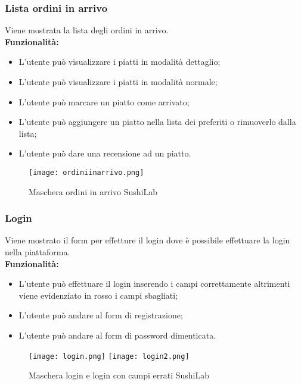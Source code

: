\subsubsection{Lista ordini in arrivo}
Viene mostrata la lista degli ordini in arrivo.\\
\textbf{Funzionalità:}
\begin{itemize}
    \item L'utente può visualizzare i piatti in modalità dettaglio;
    \item L'utente può visualizzare i piatti in modalità normale;
    \item L'utente può marcare un piatto come arrivato;
    \item L'utente può aggiungere un piatto nella lista dei preferiti o rimuoverlo dalla lista;
    \item L'utente può dare una recensione ad un piatto.
\end{itemize}
\begin{figure}[H]
    \centering
    \texttt{[image: ordiniinarrivo.png]}
    \caption{Maschera ordini in arrivo SushiLab}
\end{figure}
\pagebreak

\subsubsection{Login}
Viene mostrato il form per effetture il login dove è possibile effettuare la login nella piattaforma.\\
\textbf{Funzionalità:}
\begin{itemize}
    \item L'utente può effettuare il login inserendo i campi correttamente altrimenti viene evidenziato in rosso i campi sbagliati;
    \item L'utente può andare al form di registrazione;
    \item L'utente può andare al form di password dimenticata.
\end{itemize}
\begin{figure}[H]
    \centering
    \texttt{[image: login.png]}
    \texttt{[image: login2.png]}
    \caption{Maschera login e login con campi errati SushiLab}
\end{figure}
\pagebreak

